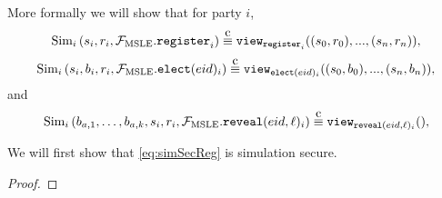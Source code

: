 More formally we will show that for party $i$,
\begin{equation}
	\label{eq:simSecReg}
	\simulator_i\left(s_i, r_i, \idealMSLE.\register_i\right) \compInd \texttt{view}_{\register_i}((s_0, r_0), ..., (s_n, r_n)),
\end{equation}
\begin{equation}
	\label{eq:simSecElect}
	\simulator_i\left(s_i, b_i, r_i, \idealMSLE.\elect_i\right) \compInd \texttt{view}_{\elect_i}((s_0, b_0), ..., (s_n, b_n)),
\end{equation}
and
\begin{equation}
	\label{eq:simSecReveal}
	\simulator_i\left(b_{a, 1}, \dots, b_{a, k}, s_i, r_i, \idealMSLE.\reveal_i\right) \compInd \texttt{view}_{\reveal_i}(),
\end{equation}

\begin{lemma}
	We will first show that \cref{eq:simSecReg} is simulation secure.
	\begin{proof}

	\end{proof}
\end{lemma}


